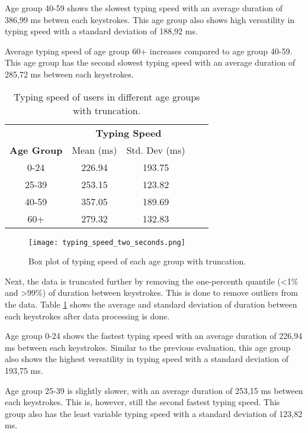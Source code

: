 Age group 40-59 shows the slowest typing speed with an average duration of 386,99 ms betwen each keystrokes.
This age group also shows high versatility in typing speed with a standard deviation of 188,92 ms.

Average typing speed of age group 60+ increases compared to age group 40-59.
This age group has the second slowest typing speed with an average duration of 285,72 ms between each keystrokes.

\begin{table}[h]
    \centering
    \begin{tabular}{ccccc}
    \toprule
    \multicolumn{1}{c}{} & \multicolumn{2}{c}{\textbf{Typing Speed}}\\
    \cmidrule(rl){2-3} \cmidrule(rl){4-5}
    \textbf{Age Group} & {Mean (ms)} & {Std. Dev (ms)} \\
    \midrule
    0-24 & 226.94 & 193.75 \\
    25-39 & 253.15 & 123.82  \\
    40-59 & 357.05 & 189.69 \\
    60+ & 279.32 & 132.83 \\
    \bottomrule
    \end{tabular}
    \caption{Typing speed of users in different age groups with truncation.}
    \label{tab:typing_behavior_one}
\end{table}

\begin{figure}[h!]
    \centering
    \texttt{[image: typing\_speed\_two\_seconds.png]}
    \caption{Box plot of typing speed of each age group with truncation.}
    \label{box_plot_typing_speed_two_seconds}
\end{figure}

Next, the data is truncated further by removing the one-percenth quantile (\textless1\% and \textgreater99\%) of duration between keystrokes.
This is done to remove outliers from the data.
Table \ref{tab:typing_behavior_one} shows the average and standard deviation of duration between each keystrokes after data processing is done.

Age group 0-24 shows the fastest typing speed with an average duration of 226,94 ms between each keystrokes.
Similar to the previous evaluation, this age group also shows the highest versatility in typing speed with a standard deviation of 193,75 ms.

Age group 25-39 is slightly slower, with an average duration of 253,15 ms between each keystrokes.
This is, however, still the second fastest typing speed.
This group also has the least variable typing speed with a standard deviation of 123,82 ms.

